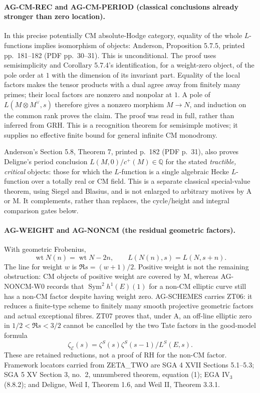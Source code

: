 \documentclass[11pt,a4paper]{article}
\begin{document}
\paragraph{AG-CM-REC and AG-CM-PERIOD (classical conclusions already
stronger than zero location).}
In this precise potentially CM absolute-Hodge category, equality of the
whole $L$-functions implies isomorphism of objects: Anderson,
Proposition 5.7.5, printed pp.~181--182 (PDF pp.~30--31). This is
unconditional. The proof uses semisimplicity and Corollary 5.7.4's
identification, for a weight-zero object, of the pole order at $1$ with
the dimension of its invariant part. Equality of the local factors makes
the tensor products with a dual agree away from finitely many primes;
their local factors are nonzero and nonpolar at $1$. A pole of
$L(M\otimes M^\vee,s)$ therefore gives a nonzero morphism
$M\longrightarrow N$, and induction on the common rank proves the
claim. The proof was read in full, rather than inferred from GRH.
This is a recognition theorem for semisimple motives; it supplies no
effective finite bound for general infinite CM monodromy.

Anderson's Section 5.8, Theorem 7, printed p.~182 (PDF p.~31), also
proves Deligne's period conclusion
$L(M,0)/c^+(M)\in\mathbb Q$ for the stated \emph{tractible, critical}
objects: those for which the $L$-function is a single algebraic Hecke
$L$-function over a totally real or CM field. This is a separate
classical special-value theorem, using Siegel and Blasius, and is not
enlarged to arbitrary motives by A or M. It complements, rather than
replaces, the cycle/height and integral comparison gates below.

\paragraph{AG-WEIGHT and AG-NONCM (the residual geometric factors).}
With geometric Frobenius,
\[
 \operatorname{wt}N(n)=\operatorname{wt}N-2n,
 \qquad L(N(n),s)=L(N,s+n).
\]
The line for weight $w$ is $\Re s=(w+1)/2$. Positive weight is not the
remaining obstruction: CM objects of positive weight are covered by M,
whereas AG-NONCM-W0 records that $\operatorname{Sym}^2h^1(E)(1)$ for a non-CM elliptic curve still
has a non-CM factor despite having weight zero. AG-SCHEMES carries ZT06: it reduces a finite-type
scheme to finitely many smooth projective geometric factors and actual
exceptional fibres. ZT07 proves that, under A, an off-line elliptic zero
in $1/2<\Re s<3/2$ cannot be cancelled by the two Tate factors in the
good-model formula
\[
 \zeta_{\mathcal E}(s)
   =\zeta^S(s)\zeta^S(s-1)/L^S(E,s).
\]
These are retained reductions, not a proof of RH for the non-CM factor.
Framework locators carried from ZETA\_TWO are SGA 4 XVII Sections 5.1--5.3;
SGA 5 XV Section 3, no.~2, unnumbered theorem, equation (1);
EGA IV$_3$ (8.8.2); and Deligne, Weil I, Theorem 1.6, and Weil II,
Theorem 3.3.1.
\end{document}
